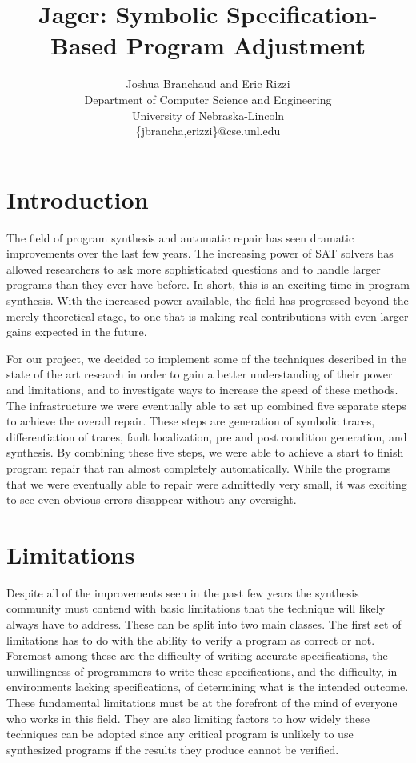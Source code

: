 \documentclass[]{article}
\author{Joshua Branchaud and Eric Rizzi \\
Department of Computer Science and Engineering \\
University of Nebraska-Lincoln \\
\{jbrancha,erizzi\}@cse.unl.edu}
\date{}
\begin{document}
\title{Jager: Symbolic Specification-Based Program Adjustment}

\maketitle

\section{Introduction}
The field of program synthesis and automatic repair has seen dramatic improvements over the last
few years.  The increasing power of SAT solvers has allowed researchers to
ask more sophisticated questions and to handle larger programs than they
ever have before.  In short, this is an exciting time in program synthesis.
With the increased power available, the field has progressed beyond the
merely theoretical stage, to one that is making real contributions with even
larger gains expected in the future.

For our project, we decided to implement some of the techniques described in
the state of the art research in order to gain a better understanding of
their power and limitations, and to investigate ways to increase the speed
of these methods.  The infrastructure we were eventually able to set up
combined five separate steps to achieve the overall repair.  These steps
are generation of symbolic traces, differentiation of traces, fault localization, pre and post condition generation, and synthesis.  By combining these five steps, we were
able to achieve a start to finish program repair that ran almost completely
automatically.  While the programs that we were eventually able to repair
were admittedly very small, it was exciting to see even obvious errors
disappear without any oversight.


\section{Limitations}
Despite all of the improvements seen in the past few years the
synthesis community must contend with basic limitations that the
technique will likely always have to address.  These can be split into two
main classes.  The first set of limitations has to do with the ability to
verify a program as correct or not.  Foremost among these are the difficulty
of writing accurate specifications, the unwillingness of programmers to
write these specifications, and the difficulty, in environments lacking
specifications, of determining what is the intended outcome.  These
fundamental limitations must be at the forefront of the mind of everyone who
works in this field.  They are also limiting factors to how widely these
techniques can be adopted since any critical program is unlikely to use
synthesized programs if the results they produce cannot be verified.
\end{document}
